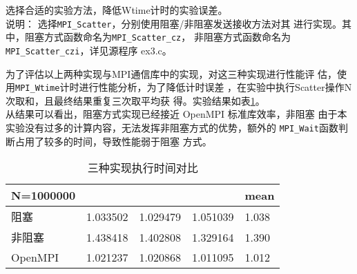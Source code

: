 \documentclass{ctexart}
\begin{document}
选择合适的实验方法，降低Wtime计时的实验误差。
\\

说明：
选择\lstinline{MPI_Scatter}，分别使用阻塞/非阻塞发送接收方法对其
进行实现。其中，阻塞方式函数命名为\lstinline{MPI_Scatter_cz}，
非阻塞方式函数命名为\lstinline{MPI_Scatter_czi}，详见源程序
ex3.c。

为了评估以上两种实现与MPI通信库中的实现，对这三种实现进行性能评
估，使用\lstinline{MPI_Wtime}计时进行性能分析，为了降低计时误差
，在实验中执行Scatter操作N次取和，且最终结果重复三次取平均获
得。实验结果如表\ref{labelex3}。
\\

从结果可以看出，阻塞方式实现已经接近 OpenMPI 标准库效率，非阻塞
由于本实验没有过多的计算内容，无法发挥非阻塞方式的优势，额外的
\lstinline{MPI_Wait}函数判断占用了较多的时间，导致性能弱于阻塞
方式。

\begin{table}[]
    \centering
    \caption{三种实现执行时间对比}
    \label{labelex3}
    \begin{tabular}{@{}lllll@{}}
        \toprule
        N=1000000 &          &          &          & mean \\ \midrule
        阻塞   & 1.033502 & 1.029479 & 1.051039 &1.038     \\
        非阻塞  & 1.438418 & 1.402808 & 1.329164 &1.390      \\
        OpenMPI & 1.021237 & 1.020868 & 1.011095 &1.012      \\ \bottomrule
    \end{tabular}
\end{table}
\end{document}
